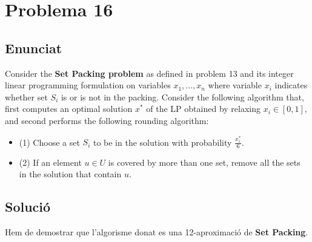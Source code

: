 \section{Problema 16}
\subsection{Enunciat}
Consider the \textbf{Set Packing problem} as defined in problem 13 and its integer linear programming formulation on variables $x_1,...,x_n$ where variable $x_i$ indicates whether set $S_i$ is or is not in the packing. Consider the following algorithm that, first computes an optimal solution $x^{*}$ of the LP obtained by relaxing $x_i \in [0,1]$, and second performs the following rounding algorithm:
\begin{itemize}
    \item (1) Choose a set $S_i$ to be in the solution with probability $\frac{x^{*}_i}{6}$.\\
    \item (2) If an element $u \in U$ is covered by more than one set, remove all the sets in the solution that contain $u$.
\end{itemize}
\subsection{Solució}
Hem de demostrar que l'algorisme donat es una 12-aproximació de \textbf{Set Packing}.
